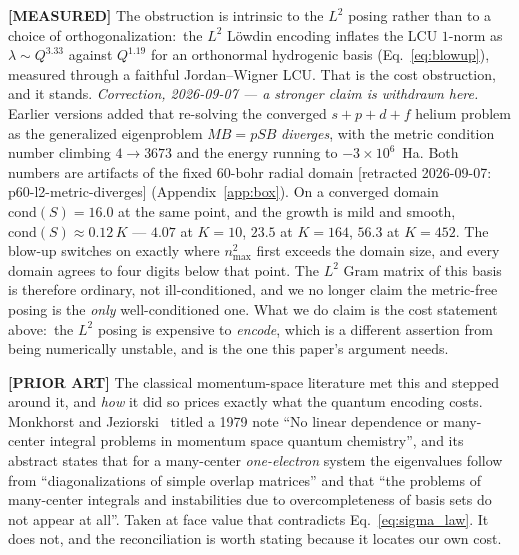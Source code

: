 \documentclass[aps,pra,twocolumn,superscriptaddress,longbibliography]{revtex4-2}
\newcommand{\gvq}[2]{#2}
\begin{document}
\textbf{[MEASURED]} The obstruction is intrinsic to the $L^{2}$ posing rather
than to a choice of orthogonalization:\ the $L^{2}$ L\"owdin encoding inflates
the LCU $1$-norm as $\lambda\sim Q^{3.33}$ against $Q^{1.19}$ for an
orthonormal hydrogenic basis (Eq.~\eqref{eq:blowup}), measured through a
faithful Jordan--Wigner LCU.  That is the cost obstruction, and it stands.
%
\emph{Correction, 2026-09-07 --- a stronger claim is withdrawn here.}  Earlier
versions added that re-solving the converged $s\!+\!p\!+\!d\!+\!f$ helium
problem as the generalized eigenproblem $MB=pSB$ \emph{diverges}, with the
metric condition number climbing $4\to3673$ and the energy running to
$-3\times10^{6}$~Ha.  Both numbers are artifacts of the fixed $60$-bohr radial
domain [retracted 2026-09-07: p60-l2-metric-diverges] (Appendix~\ref{app:box}).  On a converged domain
$\mathrm{cond}(S)=\gvq{p60_cond_S_converged}{16.0}$ at the same point, and the
growth is mild and smooth, $\mathrm{cond}(S)\approx0.12\,K$ --- $4.07$ at
$K=10$, $23.5$ at $K=164$, $56.3$ at $K=452$.  The blow-up switches on exactly
where $n_{\max}^{2}$ first exceeds the domain size, and every domain agrees to
four digits below that point.  The $L^{2}$ Gram matrix of this basis is
therefore ordinary, not ill-conditioned, and we no longer claim the
metric-free posing is the \emph{only} well-conditioned one.  What we do claim
is the cost statement above:\ the $L^{2}$ posing is expensive to
\emph{encode}, which is a different assertion from being numerically
unstable, and is the one this paper's argument needs.

\textbf{[PRIOR ART]} The classical momentum-space literature met this and
stepped around it, and \emph{how} it did so prices exactly what the quantum
encoding costs.  Monkhorst and Jeziorski~\cite{monkhorst_jeziorski1979} titled a
1979 note ``No linear dependence or many-center integral problems in momentum
space quantum chemistry'', and its abstract states that for a many-center
\emph{one-electron} system the eigenvalues follow from ``diagonalizations of
simple overlap matrices'' and that ``the problems of many-center integrals and
instabilities due to overcompleteness of basis sets do not appear at all''.
Taken at face value that contradicts Eq.~\eqref{eq:sigma_law}.  It does not,
and the reconciliation is worth stating because it locates our own cost.
\end{document}
